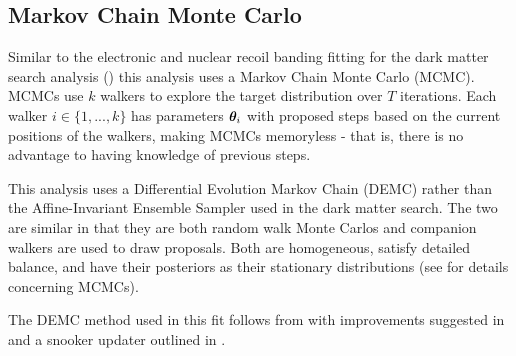 \subsection{Markov Chain Monte Carlo}
\label{subsec:elifetime_fit_mcmc}
Similar to the electronic and nuclear recoil banding fitting for the dark matter search analysis
() this analysis uses a Markov Chain Monte Carlo (MCMC).  MCMCs use $k$ walkers
to explore the target distribution
over $T$ iterations.  Each walker $i \in \{1, ..., k\}$ has parameters $\boldsymbol{\theta}_i$ with proposed steps based on the current
positions of the walkers, making MCMCs memoryless - that is, there is no advantage to having knowledge of previous steps.

This analysis uses a Differential Evolution Markov Chain (DEMC) rather than the Affine-Invariant Ensemble Sampler used in the dark matter
search.  The two are similar in that they are both random walk Monte Carlos and companion walkers are used to draw proposals.  Both are
homogeneous, satisfy detailed balance, and have their posteriors as their stationary distributions (see
 for details concerning MCMCs).

The DEMC method used in this fit follows from
 with improvements suggested in  and a snooker updater outlined in .

